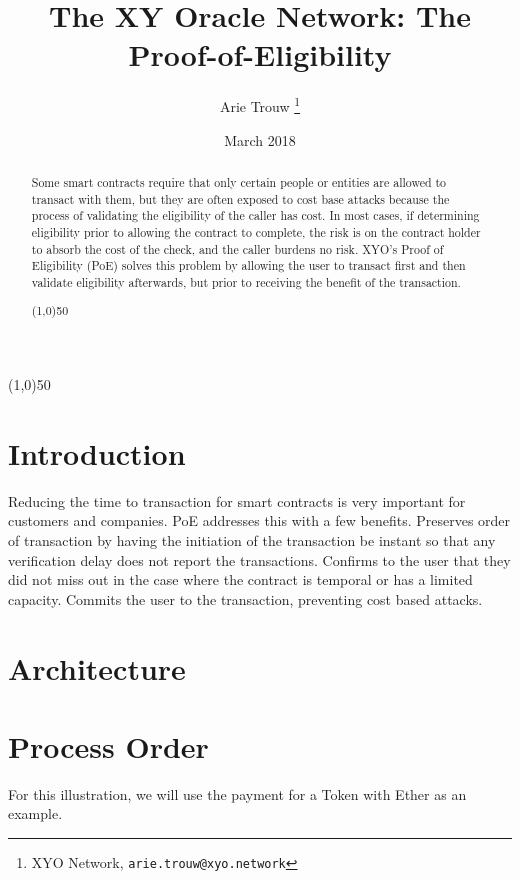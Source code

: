 \documentclass{article}
\title {The XY Oracle Network: The Proof-of-Eligibility}
\author{
    Arie Trouw
        \thanks{XYO Network, \texttt{arie.trouw@xyo.network}}
}
\date{March 2018}
\begin{document}
\maketitle

\begin{center}
\line(1,0){50}
\end{center}

\begin{abstract}
Some smart contracts require that only certain people or entities are allowed to transact with them, but they are often exposed to cost base attacks because the process of validating the eligibility of the caller has cost.  In most cases, if determining eligibility prior to allowing the contract to complete, the risk is on the contract holder to absorb the cost of the check, and the caller burdens no risk.  XYO's Proof of Eligibility (PoE) solves this problem by allowing the user to transact first and then validate eligibility afterwards, but prior to receiving the benefit of the transaction.

\begin{center}
\line(1,0){50}
\end{center}
\end{abstract}

\section{Introduction}
Reducing the time to transaction for smart contracts is very important for customers and companies.  PoE addresses this with a few benefits.  Preserves order of transaction by having the initiation of the transaction be instant so that any verification delay does not report the transactions.  Confirms to the user that they did not miss out in the case where the contract is temporal or has a limited capacity.  Commits the user to the transaction, preventing cost based attacks.

\section{Architecture}

\section{Process Order}

For this illustration, we will use the payment for a Token with Ether as an example.
\end{document}
